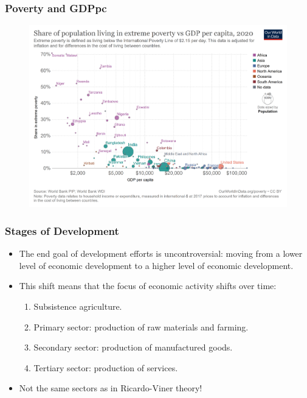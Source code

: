 \documentclass[handout]{beamer}
\begin{document}
\begin{frame} 
	\frametitle{\LARGE{Poverty and GDPpc}}
	\begin{figure}[ht!]
		\centering
		\includegraphics[height=\textheight, keepaspectratio]{poverty_vs_gdppc.png}
	\end{figure}
\end{frame}

\begin{frame} 
\frametitle{\LARGE{Stages of Development}}
\begin{itemize}
	\item The end goal of development efforts is uncontroversial: moving from a lower level of economic development to a higher level of economic development. \pause
	\item This shift means that the focus of economic activity shifts over time: 
	\begin{enumerate}
		\item Subsistence agriculture. \pause
		\item Primary sector: production of raw materials and farming. \pause
		\item Secondary sector: production of manufactured goods. \pause
		\item Tertiary sector: production of services. \pause
	\end{enumerate}
	\item Not the same sectors as in Ricardo-Viner theory!
\end{itemize}
\end{frame}
\end{document}

